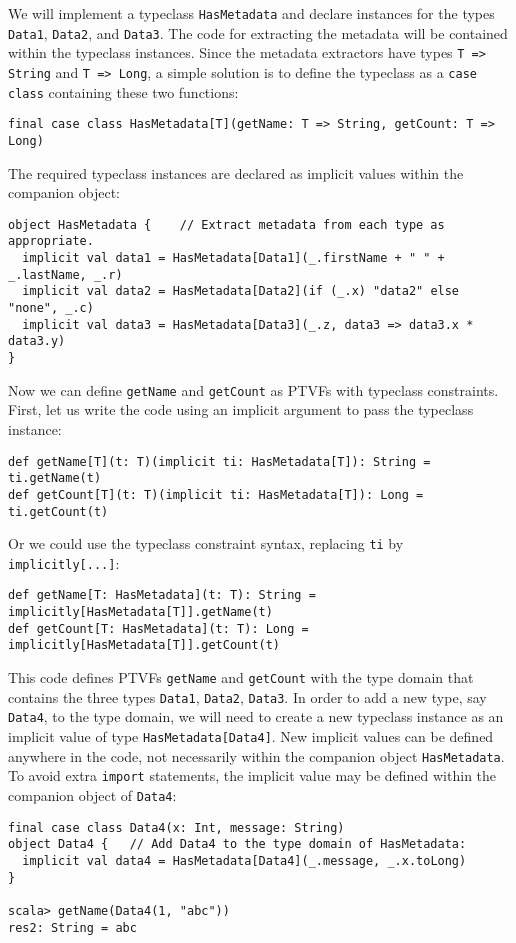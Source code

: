 We will implement a typeclass \lstinline!HasMetadata! and declare
instances for the types \lstinline!Data1!, \lstinline!Data2!, and
\lstinline!Data3!. The code for extracting the metadata will be contained
within the typeclass instances. Since the metadata extractors have
types \lstinline!T => String! and \lstinline!T => Long!, a simple
solution is to define the typeclass as a \lstinline!case class! containing
these two functions:
\begin{lstlisting}
final case class HasMetadata[T](getName: T => String, getCount: T => Long)
\end{lstlisting}
The required typeclass instances are declared as implicit values within
the companion object:
\begin{lstlisting}
object HasMetadata {    // Extract metadata from each type as appropriate.
  implicit val data1 = HasMetadata[Data1](_.firstName + " " + _.lastName, _.r)
  implicit val data2 = HasMetadata[Data2](if (_.x) "data2" else "none", _.c)
  implicit val data3 = HasMetadata[Data3](_.z, data3 => data3.x * data3.y)
}
\end{lstlisting}
Now we can define \lstinline!getName! and \lstinline!getCount! as
PTVFs with typeclass constraints. First, let us write the code using
an implicit argument to pass the typeclass instance:
\begin{lstlisting}
def getName[T](t: T)(implicit ti: HasMetadata[T]): String = ti.getName(t)
def getCount[T](t: T)(implicit ti: HasMetadata[T]): Long = ti.getCount(t)
\end{lstlisting}
Or we could use the typeclass constraint syntax, replacing \lstinline!ti!
by \lstinline!implicitly[...]!:
\begin{lstlisting}
def getName[T: HasMetadata](t: T): String = implicitly[HasMetadata[T]].getName(t)
def getCount[T: HasMetadata](t: T): Long = implicitly[HasMetadata[T]].getCount(t)
\end{lstlisting}

This code defines PTVFs \lstinline!getName! and \lstinline!getCount!
with the type domain that contains the three types \lstinline!Data1!,
\lstinline!Data2!, \lstinline!Data3!. In order to add a new type,
say \lstinline!Data4!, to the type domain, we will need to create
a new typeclass instance as an implicit value of type \lstinline!HasMetadata[Data4]!.
New implicit values can be defined anywhere in the code, not necessarily
within the companion object \lstinline!HasMetadata!. To avoid extra
\lstinline!import! statements, the implicit value may be defined
within the companion object of \lstinline!Data4!:
\begin{lstlisting}
final case class Data4(x: Int, message: String)
object Data4 {   // Add Data4 to the type domain of HasMetadata:
  implicit val data4 = HasMetadata[Data4](_.message, _.x.toLong)
}

scala> getName(Data4(1, "abc"))
res2: String = abc
\end{lstlisting}

